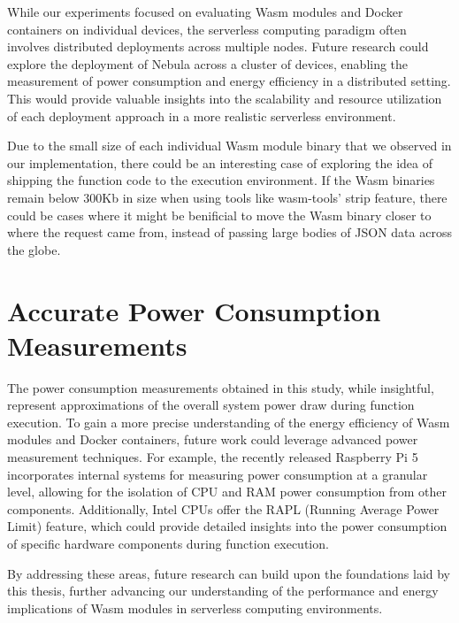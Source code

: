 \documentclass[
  table]{report}
\begin{document}
While our experiments focused on evaluating Wasm modules and Docker
containers on individual devices, the serverless computing paradigm
often involves distributed deployments across multiple nodes. Future
research could explore the deployment of Nebula across a cluster of
devices, enabling the measurement of power consumption and energy
efficiency in a distributed setting. This would provide valuable
insights into the scalability and resource utilization of each
deployment approach in a more realistic serverless environment.

Due to the small size of each individual \ac{Wasm} module binary that we
observed in our implementation, there could be an interesting case of
exploring the idea of shipping the function code to the execution
environment. If the \ac{Wasm} binaries remain below 300Kb in size when
using tools like wasm-tools' strip feature, there could be cases where
it might be benificial to move the \ac{Wasm} binary closer to where the
request came from, instead of passing large bodies of JSON data across
the globe.

\section{Accurate Power Consumption Measurements}

The power consumption measurements obtained in this study, while
insightful, represent approximations of the overall system power draw
during function execution. To gain a more precise understanding of the
energy efficiency of Wasm modules and Docker containers, future work
could leverage advanced power measurement techniques. For example, the
recently released Raspberry Pi 5 incorporates internal systems for
measuring power consumption at a granular level, allowing for the
isolation of CPU and RAM power consumption from other components.
Additionally, Intel CPUs offer the RAPL (Running Average Power Limit)
feature, which could provide detailed insights into the power
consumption of specific hardware components during function execution.

By addressing these areas, future research can build upon the
foundations laid by this thesis, further advancing our understanding of
the performance and energy implications of Wasm modules in serverless
computing environments.
\end{document}
